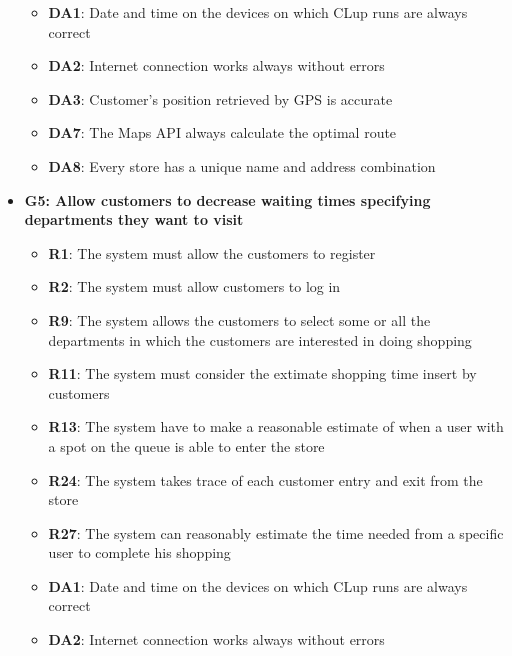 \documentclass{article}
\begin{document}
\begin{itemize}
\begin{itemize}
						\item {\bfseries DA1}: Date and time on the devices on which CLup runs are always correct
						\item {\bfseries DA2}: Internet connection works always without errors
						\item {\bfseries DA3}: Customer’s position retrieved by GPS is accurate
						\item {\bfseries DA7}: The Maps API always calculate the optimal route 
						\item {\bfseries DA8}: Every store has a unique name and address combination
						
					\end{itemize}

				\item {\bfseries G5: Allow customers to decrease waiting times specifying departments they want to visit}	

					\begin{itemize}
						
						\item {\bfseries R1}: The system must allow the customers to register
						\item {\bfseries R2}: The system must allow customers to log in
						\item {\bfseries R9}: The system allows the customers to select some or all the departments in which the customers are interested in doing shopping
						\item {\bfseries R11}: The system must consider the extimate shopping time insert by customers

						\item {\bfseries R13}: The system have to make a reasonable estimate of when a user with a spot on the queue is able to enter the store
						\item {\bfseries R24}: The system takes trace of each customer entry and exit from the store
						\item {\bfseries R27}: The system can reasonably estimate the time needed from a specific user to complete his shopping \\
		
						\item {\bfseries DA1}: Date and time on the devices on which CLup runs are always correct
						\item {\bfseries DA2}: Internet connection works always without errors
						
					\end{itemize}


\end{itemize}
\end{document}
